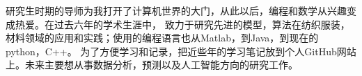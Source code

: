 \cvsection{}


\begin{cvparagraph}

研究生时期的导师为我打开了计算机世界的大门，从此以后，编程和数学从兴趣变成热爱。在过去六年的学术生涯中，
致力于研究先进的模型，算法在纺织服装，材料领域的应用和实践；使用的编程语言也从Matlab，到Java，到现在的python，C++。
为了方便学习和记录，把近些年的学习笔记放到个人GitHub网站上。未来主要想从事数据分析，预测以及人工智能方向的研究工作。
\end{cvparagraph}
